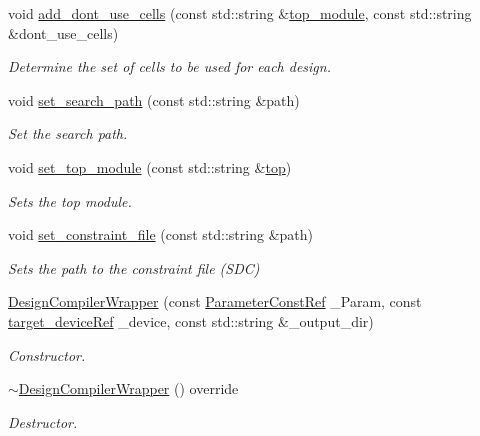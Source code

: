 \begin{DoxyCompactItemize}
void \hyperlink{classDesignCompilerWrapper_aa08b14af1bed993926b5da1499be73b4}{add\+\_\+dont\+\_\+use\+\_\+cells} (const std\+::string \&\hyperlink{classDesignCompilerWrapper_a6e95ae9b696ba0d23c09d07c8648da7d}{top\+\_\+module}, const std\+::string \&dont\+\_\+use\+\_\+cells)
\begin{DoxyCompactList}\small\item\em Determine the set of cells to be used for each design. \end{DoxyCompactList}\item 
void \hyperlink{classDesignCompilerWrapper_ad70c35a8c49dd0568b2b3df10d1c05a3}{set\+\_\+search\+\_\+path} (const std\+::string \&path)
\begin{DoxyCompactList}\small\item\em Set the search path. \end{DoxyCompactList}\item 
void \hyperlink{classDesignCompilerWrapper_a09068be079cba1f62979d528457408cb}{set\+\_\+top\+\_\+module} (const std\+::string \&\hyperlink{tutorial__pact__2019_2Introduction_2second_2module_8c_a363ff33001bb9810eee7a6a61179583b}{top})
\begin{DoxyCompactList}\small\item\em Sets the top module. \end{DoxyCompactList}\item 
void \hyperlink{classDesignCompilerWrapper_a246af7f8521eebb6e97a2a66ae31939d}{set\+\_\+constraint\+\_\+file} (const std\+::string \&path)
\begin{DoxyCompactList}\small\item\em Sets the path to the constraint file (S\+DC) \end{DoxyCompactList}\item 
\hyperlink{classDesignCompilerWrapper_ad8c376e22927c521741e50efe5423c2e}{Design\+Compiler\+Wrapper} (const \hyperlink{Parameter_8hpp_a37841774a6fcb479b597fdf8955eb4ea}{Parameter\+Const\+Ref} \+\_\+\+Param, const \hyperlink{target__device_8hpp_acedb2b7a617e27e6354a8049fee44eda}{target\+\_\+device\+Ref} \+\_\+device, const std\+::string \&\+\_\+output\+\_\+dir)
\begin{DoxyCompactList}\small\item\em Constructor. \end{DoxyCompactList}\item 
\hyperlink{classDesignCompilerWrapper_a9e0cc8209eeb5f6bc1963c94e3787bf7}{$\sim$\+Design\+Compiler\+Wrapper} () override
\begin{DoxyCompactList}\small\item\em Destructor. \end{DoxyCompactList}\item 

\end{DoxyCompactItemize}
